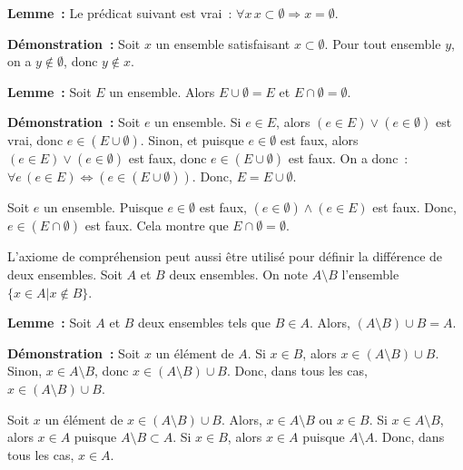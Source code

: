 \done

\medskip

\noindent\textbf{Lemme :} Le prédicat suivant est vrai : $\forall x \, x \subset \emptyset \Rightarrow x = \emptyset$.

\medskip

\noindent\textbf{Démonstration :} Soit $x$ un ensemble satisfaisant $x \subset \emptyset$.
    Pour tout ensemble $y$, on a $y \notin \emptyset$, donc $y \notin x$.
    
\done

\medskip

\noindent\textbf{Lemme :} Soit $E$ un ensemble. 
    Alors $E \cup \emptyset = E$ et $E \cap \emptyset = \emptyset$.

\medskip

\noindent\textbf{Démonstration :} 
    Soit $e$ un ensemble. 
    Si $e \in E$, alors $(e \in E) \vee (e \in \emptyset)$  est vrai, donc $e \in (E \cup \emptyset)$.
    Sinon, et puisque $e \in \emptyset$ est faux, alors $(e \in E) \vee (e \in \emptyset)$  est faux, donc $e \in (E \cup \emptyset)$ est faux.
    On a donc : $\forall e \, (e \in E) \Leftrightarrow (e \in (E \cup \emptyset))$.
    Donc, $E = E \cup \emptyset$.

    Soit $e$ un ensemble. 
    Puisque $e \in \emptyset$ est faux, $(e \in \emptyset) \wedge (e \in E)$ est faux. 
    Donc, $e \in (E \cap \emptyset)$ est faux.
    Cela montre que $E \cap \emptyset = \emptyset$.

    \done

\medskip

L'axiome de compréhension peut aussi être utilisé pour définir la différence de deux ensembles. 
Soit $A$ et $B$ deux ensembles. 
On note $A \setminus B$ l'ensemble $\lbrace x \in A \vert x \notin B \rbrace$.

\medskip

\noindent\textbf{Lemme :} Soit $A$ et $B$ deux ensembles tels que $B \in A$.
    Alors, $(A \setminus B) \cup B = A$.

\medskip

\noindent\textbf{Démonstration :}
    Soit $x$ un élément de $A$. 
    Si $x \in B$, alors $x \in (A \setminus B) \cup B$.
    Sinon, $x \in A \setminus B$, donc $x \in (A \setminus B) \cup B$.
    Donc, dans tous les cas, $x \in (A \setminus B) \cup B$.

    Soit $x$ un élément de $x \in (A \setminus B) \cup B$.
    Alors, $x \in A \setminus B$ ou $x \in B$. 
    Si $ x \in A \setminus B$, alors $x \in A$ puisque $A \setminus B \subset A$.
    Si $ x \in B$, alors $x \in A$ puisque $A \setminus A$.
    Donc, dans tous les cas, $x \in A$.

